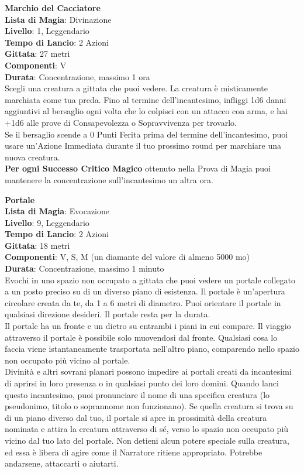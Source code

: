 \documentclass[a4paper,twoside,openany]{book}
\begin{document}
\begin{multicols}{2}
\medskip\textbf{Marchio del Cacciatore}\\
\textbf{Lista di Magia}: Divinazione\\
\textbf{Livello}: 1, Leggendario\\
\textbf{Tempo di Lancio}: 2 Azioni\\
\textbf{Gittata}: 27 metri\\
\textbf{Componenti}: V \\
\textbf{Durata}: Concentrazione, massimo 1 ora\\
Scegli una creatura a gittata che puoi vedere. La creatura è misticamente marchiata come tua preda. Fino al termine dell’incantesimo, infliggi 1d6 danni aggiuntivi al bersaglio ogni volta che lo colpisci con un attacco con arma, e hai +1d6 alle prove di Consapevolezza o Sopravvivenza per trovarlo.\\
Se il bersaglio scende a 0 Punti Ferita prima del termine dell’incantesimo, puoi usare un’Azione Immediata durante il tuo prossimo round per marchiare una nuova creatura.\\
\textbf{Per ogni Successo Critico Magico} ottenuto nella Prova di Magia puoi mantenere la concentrazione sull’incantesimo un altra ora.

\medskip\textbf{Portale}\\
\textbf{Lista di Magia}: Evocazione\\
\textbf{Livello}: 9, Leggendario\\
\textbf{Tempo di Lancio}: 2 Azioni\\
\textbf{Gittata}: 18 metri\\
\textbf{Componenti}: V, S, M (un diamante del valore di almeno 5000 mo)\\
\textbf{Durata}: Concentrazione, massimo 1 minuto\\
Evochi in uno spazio non occupato a gittata che puoi vedere un portale collegato a un posto preciso su di un diverso piano di esistenza. Il portale è un'apertura circolare creata da te, da 1 a 6 metri di diametro. Puoi orientare il portale in qualsiasi direzione desideri. Il portale resta per la durata.\\
Il portale ha un fronte e un dietro su entrambi i piani in cui compare. Il viaggio attraverso il portale è possibile solo muovendosi dal fronte. Qualsiasi cosa lo faccia viene istantaneamente trasportata nell'altro piano, comparendo nello spazio non occupato più vicino al portale.\\
Divinità e altri sovrani planari possono impedire ai portali creati da incantesimi di aprirsi in loro presenza o in qualsiasi punto dei loro domini. Quando lanci questo incantesimo, puoi pronunciare il nome di una specifica creatura (lo pseudonimo, titolo o soprannome non funzionano). Se quella creatura si trova su di un piano diverso dal tuo, il portale si apre in prossimità della creatura nominata e attira la creatura attraverso di sé, verso lo spazio non occupato più vicino dal tuo lato del portale. Non detieni alcun potere speciale sulla creatura, ed essa è libera di agire come il Narratore ritiene appropriato. Potrebbe andarsene, attaccarti o aiutarti.


\end{multicols}
\end{document}
